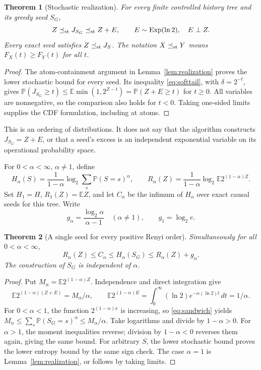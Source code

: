 \documentclass[11pt,a4paper]{article}
\newtheorem{theorem}{Theorem}
\newcommand{\E}{\mathbb E}
\newcommand{\Prob}{\mathbb P}
\begin{document}
\begin{theorem}[Stochastic realization]\label{thm:sandwich}
For every finite controlled history tree and its greedy seed $S_G$,
\begin{equation}\label{eq:sandwich}
Z\preceq_{\rm st}J_{S_G}\preceq_{\rm st}Z+E,
\qquad E\sim\operatorname{Exp}(\ln2),\quad E\perp Z.
\end{equation}
Every exact seed satisfies $Z\preceq_{\rm st}J_S$.
The notation $X\preceq_{\rm st}Y$ means $F_X(t)\ge F_Y(t)$ for all $t$.
\end{theorem}
\begin{proof}
The atom-containment argument in Lemma~\ref{lem:realization} proves the
lower stochastic bound for every seed. Its inequality
\eqref{eq:softtail}, with $\delta=2^{-t}$, gives
$\Prob(J_{S_G}\ge t)\le\E\min(1,2^{Z-t})=\Prob(Z+E\ge t)$
for $t\ge0$. All variables are nonnegative, so the comparison also holds
for $t<0$. Taking one-sided limits supplies the CDF formulation,
including at atoms.
\end{proof}
This is an ordering of distributions. It does not say that the algorithm
constructs $J_{S_G}=Z+E$, or that a seed's excess is an independent
exponential variable on its operational probability space.

For $0<\alpha<\infty$, $\alpha\ne1$, define
\[
H_\alpha(S)=\frac{1}{1-\alpha}\log_2\sum_s\Prob(S=s)^\alpha,
\qquad R_\alpha(Z)=\frac{1}{1-\alpha}\log_2\E2^{(1-\alpha)Z}.
\]
Set $H_1=H$, $R_1(Z)=\E Z$, and let $C_\alpha$ be the infimum of
$H_\alpha$ over exact causal seeds for this tree. Write
\[
g_\alpha=\frac{\log_2\alpha}{\alpha-1}\quad(\alpha\ne1),
\qquad g_1=\log_2e.
\]

\begin{theorem}[A single seed for every positive Renyi order]\label{thm:renyi}
Simultaneously for all $0<\alpha<\infty$,
\begin{equation}\label{eq:renyi}
R_\alpha(Z)\le C_\alpha\le H_\alpha(S_G)
\le R_\alpha(Z)+g_\alpha.
\end{equation}
The construction of $S_G$ is independent of $\alpha$.
\end{theorem}
\begin{proof}
Put $M_\alpha=\E2^{(1-\alpha)Z}$. Independence and direct integration give
\[
\E2^{(1-\alpha)(Z+E)}=M_\alpha/\alpha,
\qquad
\E2^{(1-\alpha)E}=
\int_0^\infty (\ln2)e^{-\alpha(\ln2)t}\,dt=1/\alpha.
\]
For $0<\alpha<1$, the function $2^{(1-\alpha)x}$ is increasing, so
\eqref{eq:sandwich} yields
$M_\alpha\le\sum_s\Prob(S_G=s)^\alpha\le M_\alpha/\alpha$.
Take logarithms and divide by $1-\alpha>0$.
For $\alpha>1$, the moment inequalities reverse; division by
$1-\alpha<0$ reverses them again, giving the same bound.
For arbitrary $S$, the lower stochastic bound proves the lower entropy
bound by the same sign check. The case $\alpha=1$ is
Lemma~\ref{lem:realization}, or follows by taking limits.
\end{proof}
\end{document}
